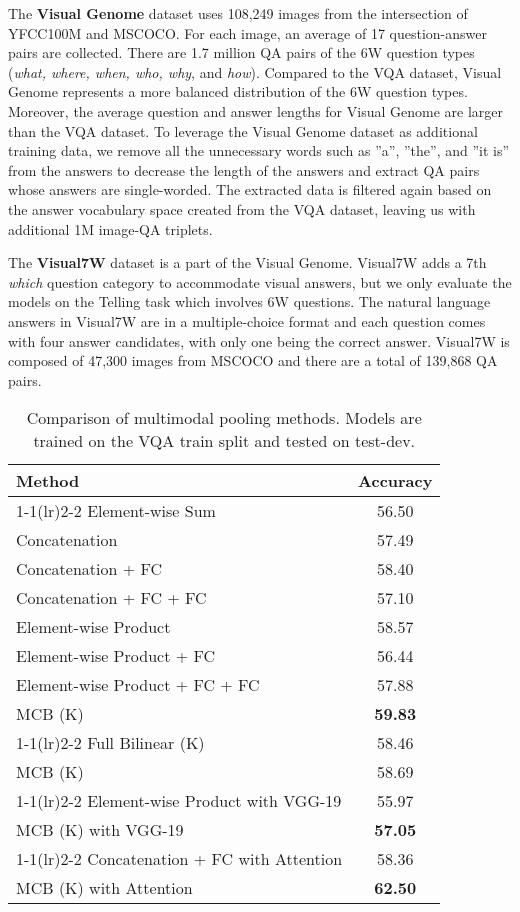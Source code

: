 \documentclass[11pt,letterpaper]{article}
\newcommand{\twocmidrule}{\cmidrule(lr){1-1}\cmidrule(lr){2-2}}
\begin{document}
The \textbf{Visual Genome} dataset \cite{krishna16arxiv} uses 108,249 images from the intersection of YFCC100M \cite{DBLP:journals/corr/ThomeeSFENPBL15} and MSCOCO. For each image, an average of 17 question-answer pairs are collected. There are 1.7 million QA pairs of the 6W question types (\textit{what, where, when, who, why}, and \textit{how}).
Compared to the VQA dataset, Visual Genome represents a more balanced distribution of the 6W question types. Moreover, the average question and answer lengths for Visual Genome are larger than the VQA dataset. To leverage the Visual Genome dataset as additional training data, we remove all the unnecessary words such as ''a'', ''the'', and ''it is'' from the answers to decrease the length of the answers and extract QA pairs whose answers are single-worded. The extracted data is filtered again based on the answer vocabulary space created from the VQA dataset, leaving us with additional 1M image-QA triplets.

The \textbf{Visual7W} dataset \cite{zhu16cvpr} is a part of the Visual Genome. Visual7W adds a 7th \textit{which} question category to accommodate visual answers, but we only evaluate the models on the Telling task which involves 6W questions. The natural language answers in Visual7W are in a multiple-choice format and each question comes with four answer candidates, with only one being the correct answer. Visual7W is composed of 47,300 images from MSCOCO and there are a total of 139,868 QA pairs. 

\begin{table}
\centering
\begin{tabular}{lc}
\toprule
 \bf Method & \bf Accuracy \\ \twocmidrule
Element-wise Sum & 56.50 \\
Concatenation & 57.49 \\
Concatenation + FC & 58.40 \\
Concatenation + FC + FC & 57.10 \\
Element-wise Product & 58.57 \\
Element-wise Product + FC & 56.44 \\
Element-wise Product + FC + FC & 57.88 \\
MCB (K) & \bf 59.83 \\
\twocmidrule
Full Bilinear (K) & 58.46 \\
MCB (K) & 58.69 \\
\twocmidrule
Element-wise Product with VGG-19 & 55.97 \\
MCB (K) with VGG-19 & \bf 57.05 \\
\twocmidrule
Concatenation + FC with Attention & 58.36 \\
MCB (K) with Attention & \bf 62.50 \\
\bottomrule
\end{tabular}
\caption{Comparison of multimodal pooling methods. Models are trained on the VQA train split and tested on test-dev.}
\label{tab:comparefusion}
\end{table}
\end{document}
